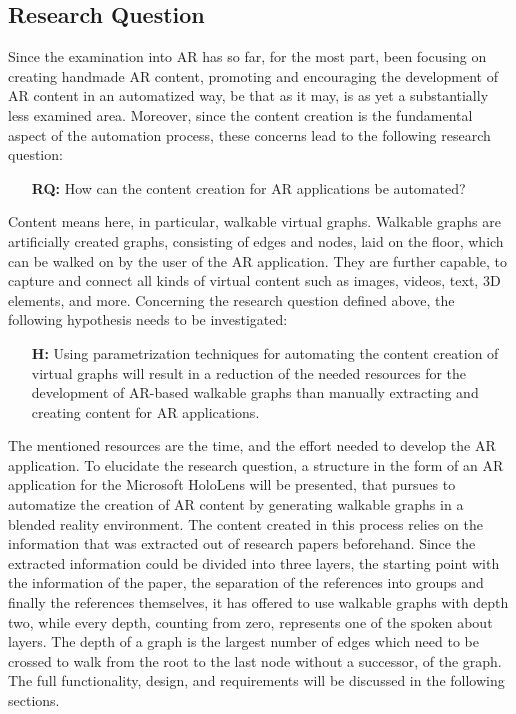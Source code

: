 \documentclass[12pt,a4paper,oneside,american,parskip=half]{article}
\begin{document}
\begin{justify}
\begin{normalsize}
\subsection{Research Question}
Since the examination into AR has so far, for the most part, been focusing on creating handmade AR content, promoting and encouraging the development of AR content in an automatized way, be that as it may, is as yet a substantially less examined area.
Moreover, since the content creation is the fundamental aspect of the automation process, these concerns lead to the following research question:
\begin{itemize}[leftmargin=2cm]
    \item [\textbf{RQ:}] How can the content creation for AR applications be automated?
\end{itemize}
Content means here, in particular, walkable virtual graphs. 
Walkable graphs are artificially created graphs, consisting of edges and nodes, laid on the floor, which can be walked on by the user of the AR application.
They are further capable, to capture and connect all kinds of virtual content such as images, videos, text, 3D elements, and more.
Concerning the research question defined above, the following hypothesis needs to be investigated:
\begin{itemize}[leftmargin=2cm]
    \item [\textbf{H:}] Using parametrization techniques for automating the content creation of virtual graphs will result in a reduction of the needed resources for the development of AR-based walkable graphs than manually extracting and creating content for AR applications.
\end{itemize}
The mentioned resources are the time, and the effort needed to develop the AR application.
To elucidate the research question, a structure in the form of an AR application for the Microsoft HoloLens will be presented, that pursues to automatize the creation of AR content by generating walkable graphs in a blended reality environment. The content created in this process relies on the information that was extracted out of research papers beforehand.
\newline
Since the extracted information could be divided into three layers, the starting point with the information of the paper, the separation of the references into groups and finally the references themselves, it has offered to use walkable graphs with depth two, while every depth, counting from zero, represents one of the spoken about layers. 
\newline
The depth of a graph is the largest number of edges which need to be crossed to walk from the root to the last node without a successor, of the graph.
The full functionality, design, and requirements will be discussed in the following sections.


\end{normalsize}
\end{justify}
\end{document}
